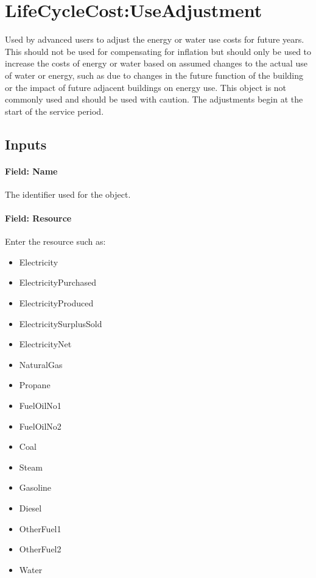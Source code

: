 \section{LifeCycleCost:UseAdjustment}\label{lifecyclecostuseadjustment}

Used by advanced users to adjust the energy or water use costs for future years. This should not be used for compensating for inflation but should only be used to increase the costs of energy or water based on assumed changes to the actual use of water or energy, such as due to changes in the future function of the building or the impact of future adjacent buildings on energy use. This object is not commonly used and should be used with caution. The adjustments begin at the start of the service period.

\subsection{Inputs}\label{inputs-060}

\paragraph{Field: Name}\label{field-name-058}

The identifier used for the object.

\paragraph{Field: Resource}\label{field-resource}

Enter the resource such as:

\begin{itemize}
\item
  Electricity
\item
  ElectricityPurchased
\item
  ElectricityProduced
\item
  ElectricitySurplusSold
\item
  ElectricityNet
\item
  NaturalGas
\item
  Propane
\item
  FuelOilNo1
\item
  FuelOilNo2
\item
  Coal
\item
  Steam
\item
  Gasoline
\item
  Diesel
\item
  OtherFuel1
\item
  OtherFuel2
\item
  Water
\end{itemize}

